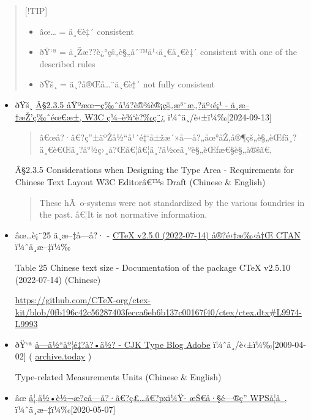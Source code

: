 \begin{quote}
{[}!TIP{]}

\begin{itemize}
\tightlist
\item
  âœ\ldots{} = ä¸€è‡´ consistent
\item
  ðŸ`ª = ä¸Žæ??è¿°çš„è§„åˆ™ä¹‹ä¸€ä¸€è‡´ consistent with one of the
  described rules
\item
  ðŸš¸ = ä¸?å®Œå\ldots¨ä¸€è‡´ not fully consistent
\end{itemize}
\end{quote}

\begin{itemize}
\item
  ðŸš¸
  \href{https://www.w3.org/International/clreq/\#considerations_in_designing_type_area}{Â§2.3.5
  åŸºæœ¬ç‰ˆå¼?è®¾è®¡çš„æ³¨æ„?äº‹é¡¹ - ä¸­æ--‡æŽ'ç‰ˆéœ€æ±‚ \textbar{} W3C
  ç¼--è¾`è?‰ç¨¿} ï¼ˆä¸­/è‹±ï¼‰{[}2024-09-13{]}

  \begin{quote}
  â€œå?·â€?ç''±äºŽå½``å¹´é‡`å±žæ´»å­---å?„åœ°åŽ‚å®¶çš„è§„èŒƒä¸?ä¸€è€Œä¸?å°½ç›¸å?Œâ€¦â€¦ä¸?ä½œä¸ºè§„èŒƒæ€§è§„å®šã€‚
  \end{quote}

  Â§2.3.5 Considerations when Designing the Type Area - Requirements for
  Chinese Text Layout \textbar{} W3C Editorâ€™s Draft (Chinese \&
  English)

  \begin{quote}
  These hÃ~o-systems were not standardized by the various foundries in
  the past. â€¦It is not normative information.
  \end{quote}
\item
  âœ\ldots è¡¨25 ä¸­æ--‡å­---å?· -
  \href{http://mirrors.ctan.org/language/chinese/ctex/ctex.pdf}{CTeX
  v2.5.0 (2022-07-14) å®?é›†æ‰‹å†Œ \textbar{} CTAN} ï¼ˆä¸­æ--‡ï¼‰

  Table 25 Chinese text size - Documentation of the package CTeX v2.5.10
  (2022-07-14) (Chinese)

  \url{https://github.com/CTeX-org/ctex-kit/blob/0fb196c42c56287403fecca6eb6b137c00167f40/ctex/ctex.dtx\#L9974-L9993}
\item
  ðŸ`ª
  \href{https://ccjktype.fonts.adobe.com/2009/04/post_1.html}{å­---ä½``åº¦é‡?å?•ä½?
  - CJK Type Blog \textbar{} Adobe} ï¼ˆä¸­/è‹±ï¼‰{[}2009-04-02{]} (
  \href{https://archive.today/QxXuk}{archive.today} )

  Type-related Measurements Units (Chinese \& English)
\item
  âœ
  \href{https://www.wps.cn/learning/question/detail/id/2940}{å¦‚ä½•è½¬æ?¢å­---å?·ã€?ç£\ldots ã€?pxï¼Ÿ-
  æŠ€å·§é---®ç­'' \textbar{} WPSå­¦å~‚} ï¼ˆä¸­æ--‡ï¼‰{[}2020-05-07{]}


\end{itemize}
